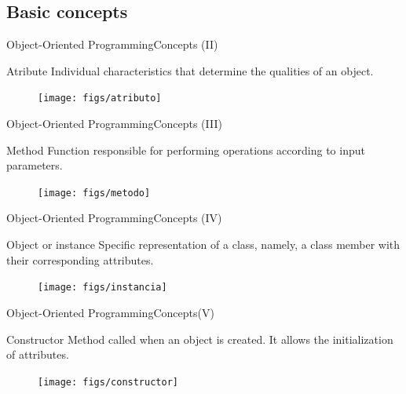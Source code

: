 \documentclass[10pt,compress]{beamer} %
\begin{document}
\subsection{Basic concepts}

\begin{frame}{Object-Oriented Programming}{Concepts (II)}
	\vfill\begin{block}{Atribute}
		Individual characteristics that determine the qualities of an object. 
  	\end{block}	
		\begin{figure}
			\texttt{[image: figs/atributo]}
		\end{figure}				
\end{frame}

\begin{frame}{Object-Oriented Programming}{Concepts (III)}
	\vfill\begin{block}{Method}
		 Function responsible for performing operations according to input parameters. 
  	\end{block}	
		\begin{figure}
			\texttt{[image: figs/metodo]}
		\end{figure}				
\end{frame}

\begin{frame}{Object-Oriented Programming}{Concepts (IV)}
	\vfill\begin{block}{Object or instance}
		 Specific representation of a class, namely, a class member with their corresponding attributes.
  	\end{block}	  	
		\begin{figure}
			\texttt{[image: figs/instancia]}
		\end{figure}				
\end{frame}

\begin{frame}{Object-Oriented Programming}{Concepts(V)}
	\begin{block}{Constructor}
		 Method called when an object is created. It allows the initialization of attributes. 
  	\end{block}	
		\begin{figure}
			\texttt{[image: figs/constructor]}
		\end{figure}				
\end{frame}
\end{document}
